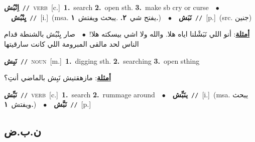 \documentclass[10pt,a4paper,twoside]{article} %
\begin{document}
\begin{multicols}{2}
{{{{\setlength\topsep{0pt}\textbf{\foreignlanguage{arabic}{اِنْبُش}}\ {\color{gray}\texttt{//}\color{black}}\ \textsc{verb}\ [c.]\ \textbf{1.}~search  \textbf{2.}~open sth.  \textbf{3.}~make sb cry or curse\ \ $\bullet$\ \ \setlength\topsep{0pt}\textbf{\foreignlanguage{arabic}{يِنْبُش}}\ {\color{gray}\texttt{//}\color{black}}\ [i.]\ \color{gray}(msa. \foreignlanguage{arabic}{يفتح شي}~\foreignlanguage{arabic}{\textbf{٢.}}  .\foreignlanguage{arabic}{يبحث ويفتش}~\foreignlanguage{arabic}{\textbf{١.}})\color{black}\ \ $\bullet$\ \ \setlength\topsep{0pt}\textbf{\foreignlanguage{arabic}{نَبَش}}\ {\color{gray}\texttt{//}\color{black}}\ [p.]\ (src. \color{gray}\foreignlanguage{arabic}{جنين}\color{black})\  \begin{flushright}\color{gray}\foreignlanguage{arabic}{\textbf{\underline{\foreignlanguage{arabic}{أمثلة}}}: أنو اللي نَبَشْلنا اياه هلا. والله ولا اشي بيسكته هلا!\ $\bullet$\ \  صار يِنْبُش بالشنطة قدام الناس لحد مالقى المبرومة اللي كانت سارقيتها}\end{flushright}\color{black}} \vspace{2mm}

{\setlength\topsep{0pt}\textbf{\foreignlanguage{arabic}{نَبِش}}\ {\color{gray}\texttt{//}\color{black}}\ \textsc{noun}\ [m.]\ \textbf{1.}~digging sth.  \textbf{2.}~searching  \textbf{3.}~open sthing\  \begin{flushright}\color{gray}\foreignlanguage{arabic}{\textbf{\underline{\foreignlanguage{arabic}{أمثلة}}}: مازهقتيش نَبِش بالماضي أنتِ؟}\end{flushright}\color{black}} \vspace{2mm}

{\setlength\topsep{0pt}\textbf{\foreignlanguage{arabic}{نَبِّش}}\ {\color{gray}\texttt{//}\color{black}}\ \textsc{verb}\ [c.]\ \textbf{1.}~search  \textbf{2.}~rummage around\ \ $\bullet$\ \ \setlength\topsep{0pt}\textbf{\foreignlanguage{arabic}{ينَبِّش}}\ {\color{gray}\texttt{//}\color{black}}\ [i.]\ \color{gray}(msa. \foreignlanguage{arabic}{يبحث ويفتش}~\foreignlanguage{arabic}{\textbf{١.}})\color{black}\ \ $\bullet$\ \ \setlength\topsep{0pt}\textbf{\foreignlanguage{arabic}{نَبَّش}}\ {\color{gray}\texttt{//}\color{black}}\ [p.]\ 

\vspace{-3mm}
\subsection*{\color{blue}\foreignlanguage{arabic}{ن.ب.ض}\color{blue}{}} 

}}}}
\end{multicols}
\end{document}
